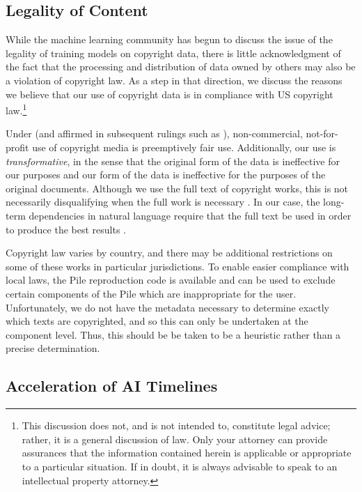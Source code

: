 \documentclass[11pt,a4paper]{article}
\begin{document}
\subsection{Legality of Content}\label{subsec:law}



While the machine learning community has begun to discuss the issue of the legality of training models on copyright data, there is little acknowledgment of the fact that the processing and distribution of data owned by others may also be a violation of copyright law. As a step in that direction, we discuss the reasons we believe that our use of copyright data is in compliance with US copyright law.\footnote{This discussion does not, and is not intended to, constitute legal advice; rather, it is a general discussion of law. Only your attorney can provide assurances that the information contained herein is applicable or appropriate to a particular situation. If in doubt, it is always advisable to speak to an intellectual property attorney.}

Under \citet{presumptive-fair-use} (and affirmed in subsequent rulings such as \citet{affirm-presumption,guild-v-google}), non-commercial, not-for-profit use of copyright media is preemptively fair use. Additionally, our use is \textit{transformative}, in the sense that the original form of the data is ineffective for our purposes and our form of the data is ineffective for the purposes of the original documents. Although we use the full text of copyright works, this is not necessarily disqualifying when the full work is necessary \citep{full-work}. In our case, the long-term dependencies in natural language require that the full text be used in order to produce the best results \citep{transformer-xl,PG19,scaling-autoregressive,liu2018generating}.

Copyright law varies by country, and there may be additional restrictions on some of these works in particular jurisdictions. To enable easier compliance with local laws, the Pile reproduction code is available and can be used to exclude certain components of the Pile which are inappropriate for the user. Unfortunately, we do not have the metadata necessary to determine exactly which texts are copyrighted, and so this can only be undertaken at the component level. Thus, this should be be taken to be a heuristic rather than a precise determination.

\subsection{Acceleration of AI Timelines}
\end{document}
